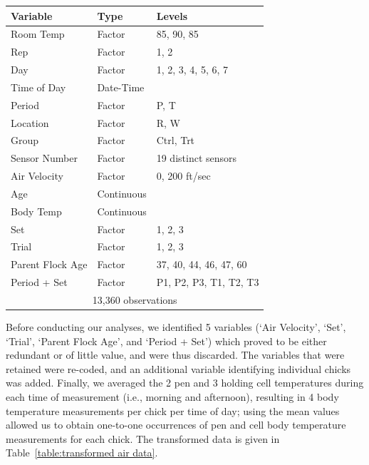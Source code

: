 \documentclass[a4paper, 10pt, titlepage]{article}
\begin{document}
\begin{table}[ht]
	\centering
	\begin{tabular}{|l|l|l|}
		\hline
		\textbf{Variable} & \textbf{Type} & \textbf{Levels}\\
		\hline
		Room Temp & Factor & 85, 90, 85\\
		Rep & Factor & 1, 2\\
		Day & Factor & 1, 2, 3, 4, 5, 6, 7\\
		Time of Day & Date-Time & \\
		Period & Factor & P, T\\
		Location & Factor & R, W\\
		Group & Factor & Ctrl, Trt\\
		Sensor Number & Factor & 19 distinct sensors\\
		Air Velocity & Factor & 0, 200 ft/sec\\
		Age & Continuous & \\
		Body Temp & Continuous & \\
		Set & Factor & 1, 2, 3\\
		Trial & Factor & 1, 2, 3\\
		Parent Flock Age & Factor & 37, 40, 44, 46, 47, 60\\
		Period + Set & Factor & P1, P2, P3, T1, T2, T3\\
		\hline
		\multicolumn{3}{|c|}{13,360 observations}\\
		\hline
	\end{tabular}
	\label{table:original air data}
\end{table}
\par
Before conducting our analyses, we identified 5 variables (`Air Velocity', `Set', `Trial', `Parent Flock Age', and `Period + Set') which proved to be either redundant or of little value, and were thus discarded. The variables that were retained were re-coded, and an additional variable identifying individual chicks was added. Finally, we averaged the 2 pen and 3 holding cell temperatures during each time of measurement (i.e., morning and afternoon), resulting in 4 body temperature measurements per chick per time of day; using the mean values allowed us to obtain one-to-one occurrences of pen and cell body temperature measurements for each chick. The transformed data is given in Table~\ref{table:transformed air data}. 
\end{document}
